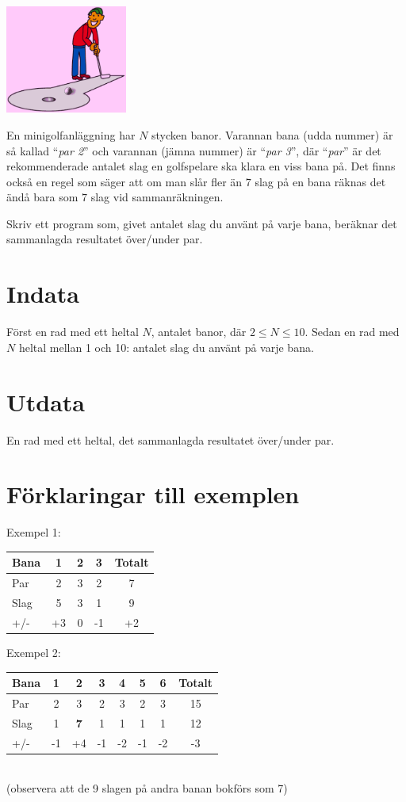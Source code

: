 \begin{center}
\includegraphics[width=0.3\textwidth]{minigolfbild.pdf}
\end{center}

En minigolfanläggning har $N$ stycken banor. Varannan bana (udda nummer) är så kallad ``{\em par 2}'' och
varannan (jämna nummer) är ``{\em par 3}'', där ``{\em par}'' är det rekommenderade antalet slag en golfspelare ska klara
en viss bana på. Det finns också en regel som säger att om man slår fler än $7$ slag på en bana räknas det ändå
bara som $7$ slag vid sammanräkningen.

Skriv ett program som, givet antalet slag du använt på varje bana, beräknar det sammanlagda resultatet över/under par. 

\section*{Indata}
Först en rad med ett heltal $N$, antalet banor, där $2\le N\le 10$. Sedan en rad med $N$ heltal mellan 1 och 10: antalet slag du använt på varje bana.

\section*{Utdata}
En rad med ett heltal, det sammanlagda resultatet över/under par.

\section*{Förklaringar till exemplen}
Exempel 1:\\
\begin{tabular}{||l|c|c|c||c||}\hline \hline
Bana & 1 & 2 & 3 & Totalt \\ \hline \hline
Par & 2 & 3 & 2 & 7 \\ \hline 
Slag & 5 & 3 & 1 & 9 \\ \hline
+/- & +3 & 0 & -1 & +2 \\ \hline \hline
\end{tabular}

Exempel 2:\\
\begin{tabular}{||l|c|c|c|c|c|c||c||}\hline \hline
Bana & 1 & 2 & 3 & 4 & 5 & 6 & Totalt \\ \hline \hline
Par & 2 & 3 & 2 & 3 & 2 & 3 & 15 \\ \hline 
Slag & 1 & {\bf 7} & 1 & 1 & 1 & 1 & 12 \\ \hline
+/- & -1 & +4 & -1 & -2 & -1 & -2 & -3\\ \hline \hline
\end{tabular}\\
(observera att de 9 slagen på andra banan bokförs som 7)

